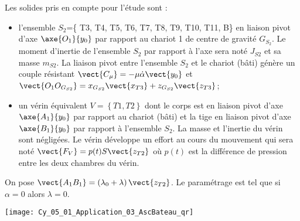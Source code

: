 Les solides pris en compte pour l’étude sont :
\begin{itemize}
\item l'ensemble $S_2$=\{ T3, T4, T5, T6, T7, T8, T9, T10, T11, B\} en liaison pivot d'axe $\axe{O_1}{y_0}$ par rapport au chariot 1 de centre de gravité $G_{S_2}$. Le moment d’inertie de l’ensemble $S_2$ par rapport à l’axe sera noté $J_{S2}$ et sa masse $m_{S2}$. La liaison pivot entre l’ensemble $S_2$ et le chariot (bâti) génère un couple résistant $\vect{C_{\mu}}=-\mu\dot{\alpha}\vect{y_0}$ et $\vect{O_1O_{G_{S2}}}=x_{G_{S2}} \vect{x_{T3}}+z_{G_{S2}} \vect{z_{T3}}$; 
\item un vérin équivalent $V=\left\{ T1,T2\right\}$ dont le corps est en liaison pivot d’axe $\axe{A_1}{y_0}$ par rapport au chariot (bâti) et la tige en liaison pivot d’axe $\axe{B_1}{y_0}$ par rapport à l’ensemble $S_2$. La masse et l’inertie du vérin sont négligées. Le vérin développe un effort au cours du mouvement qui sera noté $\vect{F_V} = p(t) S \vect{z_{T2}}$ où $p(t)$ est la différence de pression entre les deux chambres du vérin.
\end{itemize}


On pose $\vect{A_1B_1} = \left( \lambda_0+\lambda\right)\vect{z_{T2}}$. Le paramétrage est tel que si $\alpha=0$ alors $\lambda=0$.
\fi

%
%

\ifprof
\else
\begin{marginfigure}
\centering
\texttt{[image: Cy\_05\_01\_Application\_03\_AscBateau\_qr]}
\end{marginfigure}
\fi




